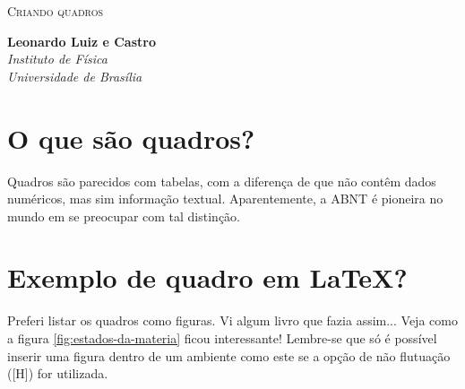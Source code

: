 \fancyfoot[LO]{\small}
\fancyfoot[RO]{\small}
\fancyfoot[LE]{\small}
\fancyfoot[RE]{\small}

\begin{discussion}

\hfill

\begin{center}
  \textsc{\large Criando quadros}\\
\end{center}

\vspace{1ex}

\begin{flushright}
  \textbf{Leonardo Luiz e Castro} \\
  \vspace{1ex}
  \textit{\small Instituto de Física} \\
  \textit{\small Universidade de Brasília} \\
\end{flushright}


\vspace{1ex}

\section*{O que são quadros?}

Quadros são parecidos com tabelas, com a diferença de que não contêm dados numéricos, mas sim informação textual. Aparentemente, a ABNT é pioneira no mundo em se preocupar com tal distinção.

\section*{Exemplo de quadro em \LaTeX?}

Preferi listar os quadros como figuras. Vi algum livro que fazia assim... Veja como a figura \ref{fig:estados-da-materia} ficou interessante! Lembre-se que só é possível inserir uma figura dentro de um ambiente como este se a opção de não flutuação ([H]) for utilizada.


\end{discussion}
